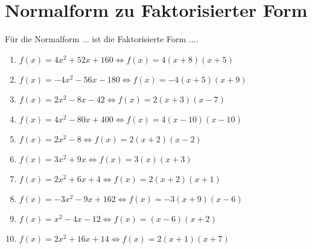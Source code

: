 \documentclass{article}%
\begin{document}
\section{Normalform zu Faktorisierter Form}%
\label{sec:NormalformzuFaktorisierterForm}%
Für die Normalform ... ist die Faktorisierte Form ....%
\begin{enumerate}[label=\alph*)]%
\item%
\newline\vspace{0.5cm}$f(x)=4x^2 + 52x + 160\Leftrightarrow f(x)=4(x+8)(x+5)$%
\item%
\newline\vspace{0.5cm}$f(x)=-4x^2 - 56x - 180\Leftrightarrow f(x)=-4(x+5)(x+9)$%
\item%
\newline\vspace{0.5cm}$f(x)=2x^2 - 8x - 42\Leftrightarrow f(x)=2(x+3)(x-7)$%
\item%
\newline\vspace{0.5cm}$f(x)=4x^2 - 80x + 400\Leftrightarrow f(x)=4(x-10)(x-10)$%
\item%
\newline\vspace{0.5cm}$f(x)=2x^2 - 8\Leftrightarrow f(x)=2(x+2)(x-2)$%
\item%
\newline\vspace{0.5cm}$f(x)=3x^2 + 9x\Leftrightarrow f(x)=3(x)(x+3)$%
\item%
\newline\vspace{0.5cm}$f(x)=2x^2 + 6x + 4\Leftrightarrow f(x)=2(x+2)(x+1)$%
\item%
\newline\vspace{0.5cm}$f(x)=-3x^2 - 9x + 162\Leftrightarrow f(x)=-3(x+9)(x-6)$%
\item%
\newline\vspace{0.5cm}$f(x)=x^2 - 4x - 12\Leftrightarrow f(x)=(x-6)(x+2)$%
\item%
\newline\vspace{0.5cm}$f(x)=2x^2 + 16x + 14\Leftrightarrow f(x)=2(x+1)(x+7)$%
\end{enumerate}

%
\end{document}
